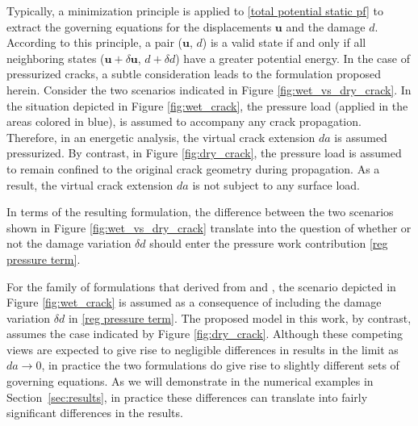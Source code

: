 Typically, a minimization principle is applied to \eqref{total potential static pf} to extract the governing equations for the displacements $\textbf{u}$ and the damage $d$. According to this principle, a pair ($\textbf{u}$, $d$) is a valid state if and only if all neighboring states ($\textbf{u} + \delta\textbf{u} $, $d+\delta d$) have a greater potential energy. In the case of pressurized cracks, a subtle consideration leads to the formulation proposed herein. Consider the two scenarios indicated in Figure \ref{fig:wet_vs_dry_crack}. In the situation depicted in Figure \ref{fig:wet_crack}, the pressure load (applied in the areas colored in blue), is assumed to accompany any crack propagation. Therefore, in an energetic analysis, the virtual crack extension $da$ is assumed  pressurized. By contrast, in Figure \ref{fig:dry_crack}, the pressure load is assumed to remain confined to the original crack geometry during propagation.  As a result, the virtual crack extension $da$ is not subject to any surface load.

In terms of the resulting formulation, the difference between the two scenarios shown in Figure \ref{fig:wet_vs_dry_crack} translate into the question of whether or not the damage variation $\delta d$ should enter the pressure work contribution \eqref{reg pressure term}.

For the family of formulations that derived from \cite{bourdin2012variational} and \cite{wheeler2014augmented}, the scenario depicted in Figure \ref{fig:wet_crack} is assumed as a consequence of including the damage variation $\delta d$ in \eqref{reg pressure term}. The proposed model in this work, by contrast, assumes the case indicated by Figure \ref{fig:dry_crack}.  Although these competing views are expected to give rise to negligible differences in results in the limit as $da \rightarrow 0$, in practice the two formulations do give rise to slightly different sets of governing equations.  As we will demonstrate in the numerical examples in Section~\ref{sec:results}, in practice these differences can translate into fairly significant differences in the results.  

